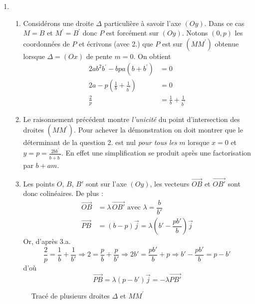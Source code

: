 \begin{enumerate}
\item \begin{enumerate}
 \item Considérons une droite $\Delta$ particulière à savoir l'axe $(Oy)$. Dans ce cas $M=B$ et $M^\prime = B^\prime$ donc $P$ est forcément sur $(Oy)$. Notons $(0,p)$ les coordonnées de $P$ et écrivons (avec 2.) que $P$ est sur $(MM^\prime)$ obtenue lorsque $\Delta = (Ox)$ de pente $m=0$. On obtient
\begin{align*}
  2ab^2b^\prime - bpa(b+b^\prime) &=0     \\
  2a - p (\frac{1}{b}+\frac{1}{b^\prime})&= 0 \\
  \frac{2}{p} &= \frac{1}{b}+\frac{1}{b^\prime} 
\end{align*}
\item Le raisonnement précédent montre \emph{l'unicité} du point d'intersection des droites $(MM^\prime)$. Pour achever la démonstration on doit montrer que le déterminant de la question 2. est nul \emph{pour tous les} $m$ lorsque $x=0$ et $y=p=\frac{2bb^\prime}{b+b^\prime}$. En effet une simplification se produit après une factorisation par $b+am$.
\item Les points $O$, $B$, $B'$ sont sur l'axe $(Oy)$, les vecteurs $\overrightarrow{OB}$ et $\overrightarrow{OB'}$ sont donc colinéaires. De plus :
\begin{align*}
 \overrightarrow{OB} &= \lambda \,\overrightarrow{OB'} \text{ avec } \lambda = \dfrac{b}{b'}\\
\overrightarrow{PB} &= (b-p)\overrightarrow j = \lambda(b'-\dfrac{pb'}{b})\overrightarrow j
\end{align*}
Or, d'après 3.a.
\begin{displaymath}
 \dfrac{2}{p}=\dfrac{1}{b}+\dfrac{1}{b'} \Rightarrow 2=\dfrac{p}{b}+\dfrac{p}{b'}
 \Rightarrow 2b'=\dfrac{pb'}{b} + p 
\Rightarrow b' - \dfrac{pb'}{b} = p-b'
\end{displaymath}
d'où
\begin{displaymath}
 \overrightarrow{PB} = \lambda(p-b')\overrightarrow j = -\lambda \overrightarrow{PB'}
\end{displaymath}

\end{enumerate}

\begin{figure}
	\begin{center}
	
	\end{center}
\caption{Tracé de plusieurs droites $\Delta$ et $MM^\prime$}
\end{figure}


\end{enumerate}

